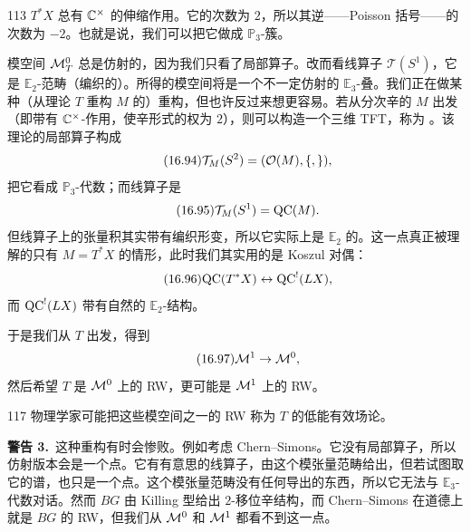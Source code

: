 \begin{srcex}{113}
$T^*X$ 总有 $\mathbb{C}^\times$ 的伸缩作用。它的次数为 $2$，所以其逆——Poisson 括号——的次数为 $-2$。也就是说，我们可以把它做成 $\mathbb{P}_3$-簇。
\end{srcex}

模空间 $\mathcal{M}^0_T$ 总是仿射的，因为我们只看了局部算子。改而看线算子 $\mathcal{T}(S^1)$，它是 $\mathbb{E}_2$-范畴（编织的）。所得的模空间将是一个不一定仿射的 $\mathbb{E}_3$-叠。我们正在做某种（从理论 $T$ 重构 $M$ 的）重构，但也许反过来想更容易。若从分次辛的 $M$ 出发（即带有 $\mathbb{C}^\times$-作用，使辛形式的权为 $2$），则可以构造一个三维 TFT，称为 。该理论的局部算子构成
\begin{equation}\tag{16.94}
\mathcal{T}_M(S^2)=(\mathcal{O}(M),\{,\}),
\end{equation}
把它看成 $\mathbb{P}_3$-代数；而线算子是
\begin{equation}\tag{16.95}
\mathcal{T}_M(S^1)=\mathrm{QC}(M).
\end{equation}
但线算子上的张量积其实带有编织形变，所以它实际上是 $\mathbb{E}_2$ 的。这一点真正被理解的只有 $M=T^*X$ 的情形，此时我们其实用的是 Koszul 对偶：
\begin{equation}\tag{16.96}
\mathrm{QC}(T^*X)\leftrightarrow\mathrm{QC}^!(LX),
\end{equation}
而 $\mathrm{QC}^!(LX)$ 带有自然的 $\mathbb{E}_2$-结构。

于是我们从 $T$ 出发，得到
\begin{equation}\tag{16.97}
\mathcal{M}^1\to\mathcal{M}^0,
\end{equation}
然后希望 $T$ 是 $\mathcal{M}^0$ 上的 RW，更可能是 $\mathcal{M}^1$ 上的 RW。

\begin{srcrem}{117}
物理学家可能把这些模空间之一的 RW 称为 $T$ 的低能有效场论。
\end{srcrem}

\par\medskip\noindent\textbf{警告 3.}\ 这种重构有时会惨败。例如考虑 Chern--Simons。它没有局部算子，所以仿射版本会是一个点。它有有意思的线算子，由这个模张量范畴给出，但若试图取它的谱，也只是一个点。这个模张量范畴没有任何导出的东西，所以它无法与 $\mathbb{E}_3$-代数对话。然而 $BG$ 由 Killing 型给出 $2$-移位辛结构，而 Chern--Simons 在道德上就是 $BG$ 的 RW，但我们从 $\mathcal{M}^0$ 和 $\mathcal{M}^1$ 都看不到这一点。%

